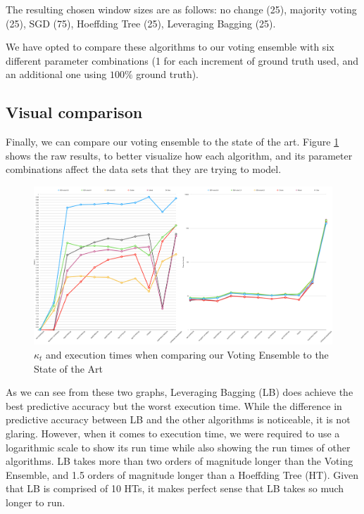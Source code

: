 The resulting chosen window sizes are as follows: no change (25),  majority voting (25), SGD (75), Hoeffding Tree (25), Leveraging Bagging (25).

We have opted to compare these algorithms to our voting ensemble with six different parameter combinations (1 for each increment of ground truth used, and an additional one using $100\%$ ground truth).


\subsection{Visual comparison}

Finally, we can compare our voting ensemble to the state of the art. Figure \ref{fig:raw_compare_sota_all} shows the raw results, to better visualize how each algorithm, and its parameter combinations affect the data sets that they are trying to model.

\begin{figure}
  \includegraphics[width=\linewidth]{./images/chapter5/compare_sota_all}
\caption{\label{fig:raw_compare_sota_all}$\kappa_t$ and execution times when comparing our Voting Ensemble to the State of the Art}
\end{figure}

As we can see from these two graphs, Leveraging Bagging (LB) does achieve the best predictive accuracy but the worst execution time. While the difference in predictive accuracy between LB and the other algorithms is noticeable, it is not glaring. However, when it comes to execution time, we were required to use a logarithmic scale to show its run time while also showing the run times of other algorithms. LB takes more than two orders of magnitude longer than the Voting Ensemble, and 1.5 orders of magnitude longer than a Hoeffding Tree (HT). Given that LB is comprised of 10 HTs, it makes perfect sense that LB takes so much longer to run.

